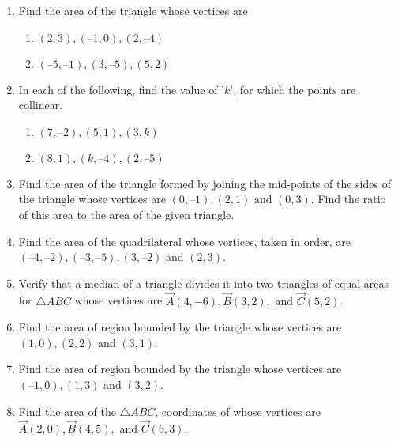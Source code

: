 \documentclass[12pt]{article}
\begin{document}
\fi
\begin{enumerate}[label=\thesection.\arabic*,ref=\thesection.\theenumi]
\item Find the area of the triangle whose vertices are 
\begin{enumerate}
\item $(2, 3), (–1, 0), (2, – 4)$
\item $(–5, –1), (3, –5), (5, 2)$ 
\end{enumerate}
		\label{10/7/3/1}
\solution
		

\item In each of the following, find the value of '$k$', for which the points are collinear.
\begin{enumerate}
\item $(7, –2), (5, 1), (3, k)$
\item $(8, 1), (k, – 4), (2, –5)$
\end{enumerate}
		\label{10/7/3/2}
\solution
%		

\item Find the area of the triangle formed by joining the mid-points of the sides of the triangle whose vertices are $(0, –1), (2, 1) \text{ and } (0, 3)$. Find the ratio of this area to the area of the given triangle.
	\\
\solution
		

\item Find the area of the quadrilateral whose vertices, taken in order, are $(– 4, – 2), (– 3, – 5), (3, – 2)$  and $ (2, 3)$.
	\\
\solution
		

\item Verify that a median of a triangle divides it into two triangles of equal areas for $\triangle ABC$ whose vertices are $\vec{A}(4, -6), \vec{B}(3, 2), \text{ and } \vec{C}(5, 2)$. 
		\label{10/7/3/5}
		\\
\solution
		

\item Find the area of region bounded by the triangle whose
	vertices are $(1, 0), (2, 2) \text{ and } (3, 1)$. 
\item Find the area of region bounded by the triangle whose vertices
	are $(– 1, 0), (1, 3) \text{ and } (3, 2)$. 

\item Find the area of the $\triangle ABC$, coordinates of whose vertices are $\vec{A}(2, 0), \vec{B}(4, 5), \text{ and } \vec{C}(6, 3)$.

\end{enumerate}
\end{document}
